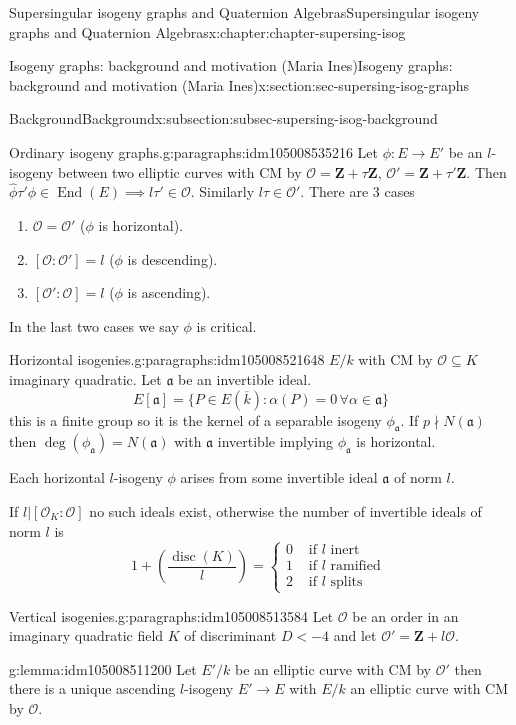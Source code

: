 \documentclass[oneside,10pt,]{book}
\numberwithin{equation}{section}
\newcommand{\ideal}[1]{\mathfrak{#1}}
\newcommand{\lb}{[}
\newcommand{\rb}{]}
\newcommand{\ZZ}{\mathbf{Z}}
\newcommand{\ints}{\mathcal{O}}
\DeclareMathOperator{\End}{End}
\DeclareMathOperator{\disc}{disc}
\newcommand{\lt}{<}
\newcommand{\amp}{&}
\begin{document}
\begin{chapterptx}{Supersingular isogeny graphs and Quaternion Algebras}{}{Supersingular isogeny graphs and Quaternion Algebras}{}{}{x:chapter:chapter-supersing-isog}
\begin{sectionptx}{Isogeny graphs: background and motivation (Maria Ines)}{}{Isogeny graphs: background and motivation (Maria Ines)}{}{}{x:section:sec-supersing-isog-graphs}
\begin{subsectionptx}{Background}{}{Background}{}{}{x:subsection:subsec-supersing-isog-background}
\begin{paragraphs}{Ordinary isogeny graphs.}{g:paragraphs:idm105008535216}
Let \(\phi\colon E\to E'\) be an \(l\)-isogeny between two elliptic curves with CM by \(\ints = \ZZ+\tau\ZZ\), \(\ints ' = \ZZ+\tau'\ZZ\). Then \(\hat\phi \tau' \phi \in \End(E) \implies l\tau ' \in \ints\). Similarly \(l\tau \in \ints'\). There are 3 cases%
\begin{enumerate}
\item{}\(\ints = \ints'\) (\(\phi\) is horizontal).%
\item{}\(\lb\ints : \ints' \rb = l\) (\(\phi\) is descending).%
\item{}\(\lb\ints' : \ints \rb = l\) (\(\phi\) is ascending).%
\end{enumerate}
In the last two cases we say \(\phi\) is critical.%
\end{paragraphs}%
\begin{paragraphs}{Horizontal isogenies.}{g:paragraphs:idm105008521648}%
\(E/k\) with CM by \(\ints \subseteq K\) imaginary quadratic. Let \(\ideal a\) be an invertible ideal.%
\begin{equation*}
E\lb \ideal a \rb = \{ P \in E(\overline k) : \alpha (P)  = 0\, \forall \alpha \in \ideal a\}
\end{equation*}
this is a finite group so it is the kernel of a separable isogeny \(\phi_{\ideal a }\). If \(p \nmid N(\ideal a)\) then \(\deg(\phi_{\ideal a}) = N(\ideal a)\) with \(\ideal a\) invertible implying \(\phi_{\ideal a} \) is horizontal.%
\par
Each horizontal \(l\)-isogeny \(\phi\) arises from some invertible ideal \(\ideal a\) of norm \(l\).%
\par
If \(l | \lb \ints_K : \ints \rb \) no such ideals exist, otherwise the number of invertible ideals of norm \(l\) is%
\begin{equation*}
1+ \left(\frac {\disc(K)}{l}\right) = \begin{cases}0\amp\text{ if }l \text{ inert }\\ 1\amp\text{ if }l \text{ ramified }\\ 2\amp\text{ if }l \text{ splits}\end{cases}
\end{equation*}
%
\end{paragraphs}%
\begin{paragraphs}{Vertical isogenies.}{g:paragraphs:idm105008513584}%
Let \(\ints\) be an order in an imaginary quadratic field \(K \) of discriminant \(D \lt -4\) and let \(\ints' = \ZZ+l\ints\).%
\begin{lemma}{}{}{g:lemma:idm105008511200}%
Let \(E' / k\)  be an elliptic curve with CM by \(\ints '\) then there is a  unique ascending \(l\)-isogeny \(E'\to E\) with \(E/k\) an elliptic curve with CM by \(\ints\).%

\end{lemma}
\end{paragraphs}
\end{subsectionptx}
\end{sectionptx}
\end{chapterptx}
\end{document}
